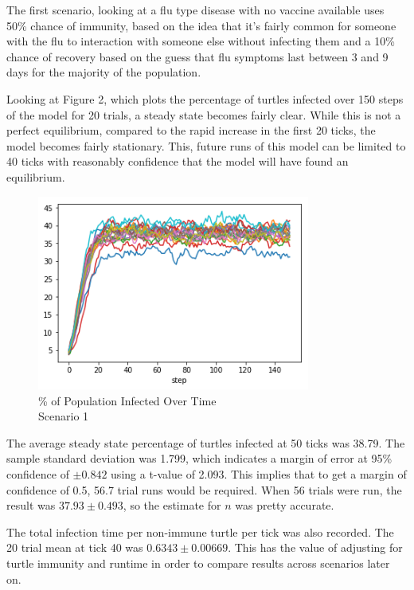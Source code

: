 \documentclass[11pt]{article} %
\begin{document}
The first scenario, looking at a flu type disease with no vaccine available uses 50\% chance of immunity, based on the idea that it's fairly common for someone with the flu to interaction with someone else without infecting them and a 10\% chance of recovery based on the guess that flu symptoms last between 3 and 9 days for the majority of the population.


Looking at Figure 2, which plots the percentage of turtles infected over 150 steps of the model for 20 trials, a steady state becomes fairly clear. While this is not a perfect equilibrium, compared to the rapid increase in the first 20 ticks, the model becomes fairly stationary.  This, future runs of this model can be limited to 40 ticks with reasonably confidence that the model will have found an equilibrium. 

\begin{figure}
\centering
\includegraphics[width=0.8\textwidth]{scen_1_steady_state}
\caption{\% of Population Infected Over Time \\ Scenario 1}
\end{figure}



The average steady state percentage of turtles infected at 50 ticks was 38.79. The sample standard deviation was 1.799, which indicates a margin of error at 95\% confidence of $\pm 0.842$ using a t-value of 2.093. This implies that to get a margin of confidence of 0.5, 56.7 trial runs would be required. When 56 trials were run, the result was $37.93 \pm 0.493$, so the estimate for $n$ was pretty accurate. 

The total infection time per non-immune turtle per tick was also recorded. The 20 trial mean at tick 40 was $0.6343 \pm 0.00669$. This has the value of adjusting for turtle immunity and runtime in order to compare results across scenarios later on. 
\end{document}
